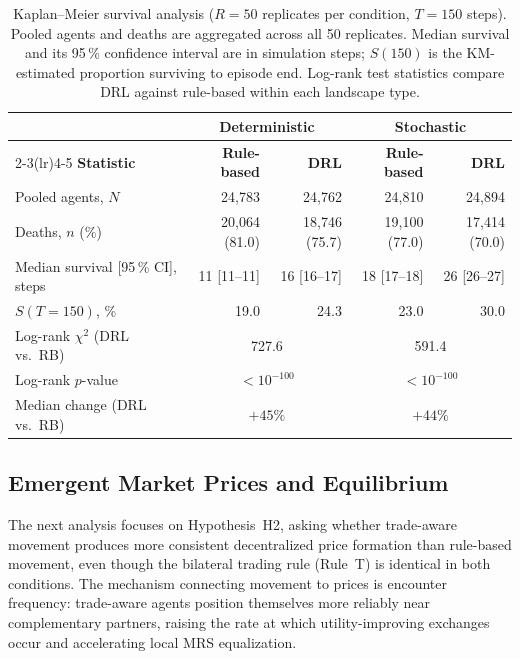 \documentclass[pdflatex,sn-mathphys-num]{sn-jnl}%
\theoremstyle{thmstyleone}%
\theoremstyle{thmstyletwo}%
\theoremstyle{thmstylethree}%
\begin{document}
\begin{table}[ht]
\centering
\caption{Kaplan--Meier survival analysis ($R = 50$ replicates per condition, $T = 150$ steps). Pooled agents and deaths are aggregated across all 50 replicates. Median survival and its 95\,\% confidence interval are in simulation steps; $S(150)$ is the KM-estimated proportion surviving to episode end. Log-rank test statistics compare DRL against rule-based within each landscape type.}
\label{tab:km_survival}
\begin{tabular}{lrrrr}
\toprule
 & \multicolumn{2}{c}{\textbf{Deterministic}} & \multicolumn{2}{c}{\textbf{Stochastic}} \\
\cmidrule(lr){2-3}\cmidrule(lr){4-5}
\textbf{Statistic} & \textbf{Rule-based} & \textbf{DRL} & \textbf{Rule-based} & \textbf{DRL} \\
\midrule
Pooled agents, $N$                 & 24{,}783           & 24{,}762           & 24{,}810           & 24{,}894           \\
Deaths, $n$ (\%)                   & 20{,}064 (81.0)    & 18{,}746 (75.7)    & 19{,}100 (77.0)    & 17{,}414 (70.0)    \\
Median survival [95\,\% CI], steps & 11 [11--11]        & 16 [16--17]        & 18 [17--18]        & 26 [26--27]        \\
$S(T\!=\!150)$, \%                 & 19.0               & 24.3               & 23.0               & 30.0               \\
\midrule
Log-rank $\chi^{2}$ (DRL vs.\ RB) & \multicolumn{2}{c}{727.6}              & \multicolumn{2}{c}{591.4}              \\
Log-rank $p$-value                 & \multicolumn{2}{c}{$<\!10^{-100}$}    & \multicolumn{2}{c}{$<\!10^{-100}$}    \\
Median change (DRL vs.\ RB)        & \multicolumn{2}{c}{$+45\%$}           & \multicolumn{2}{c}{$+44\%$}           \\
\bottomrule
\end{tabular}
\end{table}

\subsection{Emergent Market Prices and Equilibrium}
The next analysis focuses on Hypothesis~H2, asking whether trade-aware movement
produces more consistent decentralized price formation than rule-based movement,
even though the bilateral trading rule (Rule~T) is identical in both conditions.
The mechanism connecting movement to prices is encounter frequency: trade-aware
agents position themselves more reliably near complementary partners, raising the
rate at which utility-improving exchanges occur and accelerating local MRS
equalization.
\end{document}
